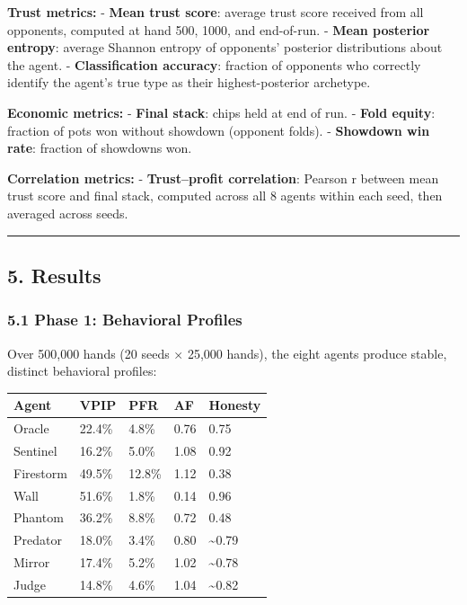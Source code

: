 \documentclass[
]{article}
\begin{document}
\textbf{Trust metrics:} - \textbf{Mean trust score}: average trust score
received from all opponents, computed at hand 500, 1000, and end-of-run.
- \textbf{Mean posterior entropy}: average Shannon entropy of opponents'
posterior distributions about the agent. - \textbf{Classification
accuracy}: fraction of opponents who correctly identify the agent's true
type as their highest-posterior archetype.

\textbf{Economic metrics:} - \textbf{Final stack}: chips held at end of
run. - \textbf{Fold equity}: fraction of pots won without showdown
(opponent folds). - \textbf{Showdown win rate}: fraction of showdowns
won.

\textbf{Correlation metrics:} - \textbf{Trust--profit correlation}:
Pearson r between mean trust score and final stack, computed across all
8 agents within each seed, then averaged across seeds.

\begin{center}\rule{0.5\linewidth}{0.5pt}\end{center}

\hypertarget{results}{%
\subsection{5. Results}\label{results}}

\hypertarget{phase-1-behavioral-profiles}{%
\subsubsection{5.1 Phase 1: Behavioral
Profiles}\label{phase-1-behavioral-profiles}}

Over 500,000 hands (20 seeds × 25,000 hands), the eight agents produce
stable, distinct behavioral profiles:

\begin{longtable}[]{@{}lllll@{}}
\toprule\noalign{}
Agent & VPIP & PFR & AF & Honesty \\
\midrule\noalign{}
\endhead
\bottomrule\noalign{}
\endlastfoot
Oracle & 22.4\% & 4.8\% & 0.76 & 0.75 \\
Sentinel & 16.2\% & 5.0\% & 1.08 & 0.92 \\
Firestorm & 49.5\% & 12.8\% & 1.12 & 0.38 \\
Wall & 51.6\% & 1.8\% & 0.14 & 0.96 \\
Phantom & 36.2\% & 8.8\% & 0.72 & 0.48 \\
Predator & 18.0\% & 3.4\% & 0.80 & \textasciitilde0.79 \\
Mirror & 17.4\% & 5.2\% & 1.02 & \textasciitilde0.78 \\
Judge & 14.8\% & 4.6\% & 1.04 & \textasciitilde0.82 \\
\end{longtable}
\end{document}
